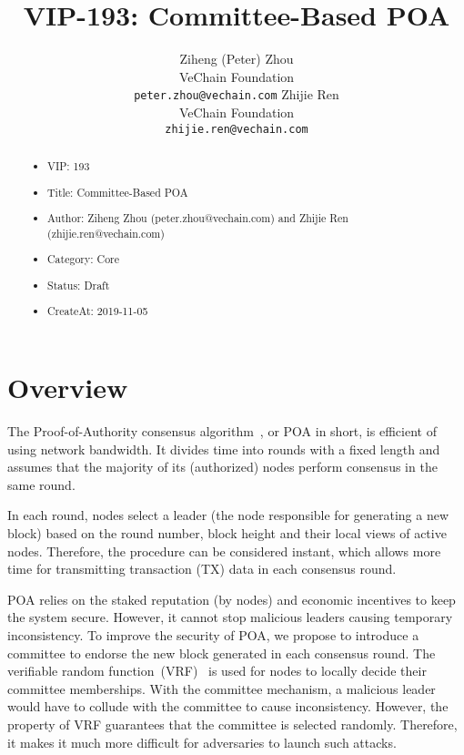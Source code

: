 \documentclass{article}
\title{VIP-193: Committee-Based POA}
\author{
  Ziheng (Peter) Zhou \vspace{1ex}\\
  VeChain Foundation \\
  \texttt{peter.zhou@vechain.com}
  \And
  Zhijie Ren \vspace{1ex} \\
  VeChain Foundation \\
  \texttt{zhijie.ren@vechain.com}
}
\date{\vspace{-5ex}}
\begin{document}
\maketitle

\begin{abstract}
\begin{itemize}
    \item VIP: 193
    \item Title: Committee-Based POA
    \item Author: Ziheng Zhou (peter.zhou@vechain.com) and Zhijie Ren (zhijie.ren@vechain.com)
    \item Category: Core
    \item Status: Draft
    \item CreateAt: 2019-11-05
\end{itemize}
\end{abstract}



\section{Overview}
The Proof-of-Authority consensus algorithm~\cite{VWP18}, or POA in short, is efficient of using network bandwidth. It divides time into rounds with a fixed length and assumes that the majority of its (authorized) nodes perform consensus in the same round. 

In each round, nodes select a leader (the node responsible for generating a new block) based on the round number, block height and their local views of active nodes. Therefore, the procedure can be considered instant, which allows more time for transmitting transaction (TX) data in each consensus round.

POA relies on the staked reputation (by nodes) and economic incentives to keep the system secure. However, it cannot stop malicious leaders causing temporary inconsistency. To improve the security of POA, we propose to introduce a committee to endorse the new block generated in each consensus round. The verifiable random function~(VRF)~\cite{PapEtAl99} is used for nodes to locally decide their committee memberships. With the committee mechanism, a malicious leader would have to collude with the committee to cause inconsistency. However, the property of VRF guarantees that the committee is selected randomly. Therefore, it makes it much more difficult for adversaries to launch such attacks.  
\end{document}
